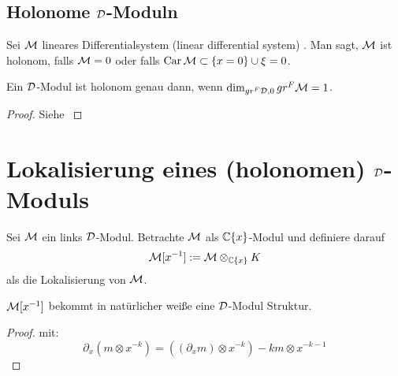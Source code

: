 \subsection{Holonome $\mathcal{D}$-Moduln}
\begin{comment}
TODO: defn of Car als Charakteristische Varietät
\end{comment}
\begin{defn} \cite[Def 3.3.1.]{sabbah_cimpa90}
Sei $\mathcal{M}$ lineares Differentialsystem 
(linear differential system) %
.  Man sagt, $\mathcal{M}$ ist holonom, falls $\mathcal{M}=0$ oder falls $\operatorname{Car}\mathcal{M}\subset
\{x=0\}\cup{\xi=0}$.
\end{defn}
\begin{lem} \cite[Lem 3.3.8.]{sabbah_cimpa90}
Ein $\mathcal{D}$-Modul ist holonom genau dann, wenn $\dim_{gr^F\mathcal{D},0}gr^F\mathcal{M}=1$.
\end{lem}
\begin{proof}
Siehe \cite[Lem 3.3.8.]{sabbah_cimpa90}
\end{proof}

\begin{comment}
\section{Lokalisierung von $\Ckx$-Moduln}
\cite[Chap 4.1.]{sabbah_cimpa90}
Sei $M$ ein $\Ckx$-Modul. Wir schreiben $M[x^{-1}]$ für den $K$-Vektor Raum
$M\otimes_{\Ckx}K$. Im allgemeinen gilt, falls $M$ von andlichen Typ über
$\Ckx$ ist, so ist $C[x^{-1}]$ von endlichem Typ über $K$. Bemerke aber, dass
$M[x^{-1}]$ generell nicht von endlichem Typ über $\Ckx$ ist.
\end{comment}

\section{Lokalisierung eines (holonomen) $\mathcal{D}$-Moduls}
\cite[Chap 4.2.]{sabbah_cimpa90}
Sei $\mathcal{M}$ ein links $\mathcal{D}$-Modul. Betrachte $\mathcal{M}$ als $\mathbb{C}\{x\}$-Modul und
definiere darauf
\[ \mathcal{M}[x^{-1}]:=\mathcal{M}\otimes_{\mathbb{C}\{x\}}K \]
als die Lokalisierung von $\mathcal{M}$.
\begin{prop} \cite[Prop 4.2.1.]{sabbah_cimpa90}
$\mathcal{M}[x^{-1}]$ bekommt in natürlicher weiße eine $\mathcal{D}$-Modul Struktur.
\end{prop}
\begin{proof} \cite[Prop 4.2.1.]{sabbah_cimpa90}
mit:
\[
\partial_x(m\otimes x^{-k})=((\partial_xm)\otimes x^{-k})-km\otimes x^{-k-1}
\]
\begin{comment}
beweis der $\cD$-linearität ist als übung gelassen
\end{comment}
\end{proof}


